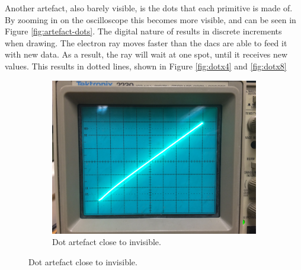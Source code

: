 Another artefact, also barely visible, is the dots that each primitive is made of.
By zooming in on the oscilloscope this becomes more visible, and can be seen in Figure \ref{fig:artefact-dots}.
The digital nature of \vthreek results in discrete increments when drawing.
The electron ray moves faster than the \gls{dac}s are able to feed it with new data.
As a result, the ray will wait at one spot, until it receives new values.
This results in dotted lines, shown in Figure \ref{fig:dotx4} and \ref{fig:dotx8}

\begin{figure}[h!]
   	\centering
    \begin{subfigure}[b]{\textwidth}
   		\centering
       	\includegraphics[height=0.4\textheight]{images/dots_x1.jpg}
       	\caption{Dot artefact close to invisible.}
       	\label{fig:dotx1}
    \end{subfigure}
\end{figure}

